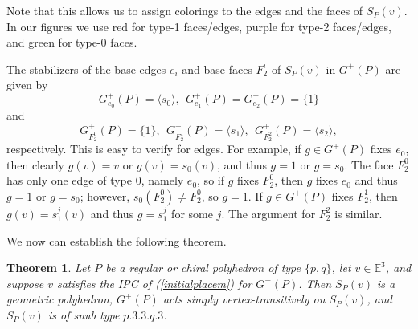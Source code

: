 \documentclass[12pt]{article}
\newtheorem{theorem}{Theorem}[section]
\theoremstyle{definition}\newtheorem{definition}{Definition}[section]
\begin{document}
Note that this allows us to assign colorings to the edges and the faces of $S_P(v)$. In our figures we use red for type-1 faces/edges, purple for type-2 faces/edges, and green for type-0 faces. 
\smallskip

The stabilizers of the base edges $e_i$ and base faces $F_2^i$ of $S_P(v)$ in $G^+(P)$ are given by 
\begin{equation}
\label{stabei}
G^{+}_{e_0}(P) = \langle s_0 \rangle,\;\, G^{+}_{e_1}(P) = G^{+}_{e_2}(P) = \{1\} 
\end{equation}
and 
\begin{equation}
\label{stabF2i}
G^{+}_{F_2^0}(P) = \{1\}, \;\, G^{+}_{F_2^1}(P) = \langle s_1 \rangle, \;\, G^{+}_{F_2^2}(P) = \langle s_2 \rangle,
\end{equation}
respectively. This is easy to verify for edges. For example, if $g\in G^+(P)$ fixes $e_0$, then clearly $g(v) = v$ or $g(v) = s_0(v)$, and thus $g=1$ or $g=s_0$. The face $F_2^0$ has only one edge of type 0, namely $e_0$, so if $g$ fixes $F_2^0$, then $g$ fixes $e_0$ and thus $g=1$ or $g=s_0$; however, $s_0(F_2^0) \neq F_2^0$, so $g=1$. If $g\in G^+(P)$ fixes $F_2^1$, then $g(v) = s_1^j(v)$ and thus $g=s_1^j$ for some $j$. The argument for ${F_2^2}$ is similar. 
\medskip

We now can establish the following theorem.

\begin{theorem}
\label{thm1}
Let $P$ be a regular or chiral polyhedron of type $\{p,q\}$, let $v\in \mathbb{E}^3$, and suppose $v$ satisfies the IPC of (\ref{initialplacem}) for $G^+(P)$. Then $S_{P}(v)$ is a geometric polyhedron, $G^{+}(P)$ acts simply vertex-transitively on $S_{P}(v)$, and $S_{P}(v)$ is of snub type $p.3.3.q.3$. 
\end{theorem}
\end{document}
